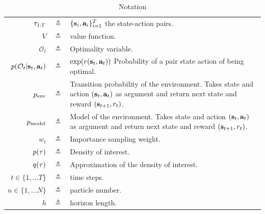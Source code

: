 \begin{table}[H]\caption{Notation}
\begin{center}%
\begin{tabular}{r c p{10cm} }
\toprule
$\tau_{1:T}$ & $\triangleq$ & $\{{\mathbf{s}}_i, {\mathbf{a}}_i\}_{i=1}^T$ the state-action pairs.\\
$V$  & $\triangleq$ & value function.\\
$\mathcal{O}_t$ & $\triangleq$ & Optimality variable.\\
$p(\mathcal{O}_t|{\mathbf{s}}_t, {\mathbf{a}}_t)$ & $\triangleq$ & $\exp(r({\mathbf{s}}_t, {\mathbf{a}}_t))$ Probability of a pair state action of being optimal.\\
$p_{\text{env}}$ & $\triangleq$ & Transition probability of the environment. Takes state and action $({\mathbf{s}}_t, {\mathbf{a}}_t)$ as argument and return next state and reward $({\mathbf{s}}_{t+1}, r_t)$.\\
$p_{\rm{model}}$ & $\triangleq$ & Model of the environment. Takes state and action $({\mathbf{s}}_t, {\mathbf{a}}_t)$ as argument and return next state and reward $({\mathbf{s}}_{t+1}, r_t)$.\\
$w_t$ & $\triangleq$ & Importance sampling weight.\\ 
$p(\tau)$  & $\triangleq$ & Density of interest.\\
$q(\tau)$  & $\triangleq$ & Approximation of the density of interest.\\
$t \in \{1, \ldots T\}$ & $\triangleq$ & time steps. \\
$n \in \{1, \ldots N\}$ & $\triangleq$ & particle number. \\
$h$ & $\triangleq$ & horizon length. \\
\bottomrule
\end{tabular}
\end{center}
\label{tab:notation}
\end{table}

%

